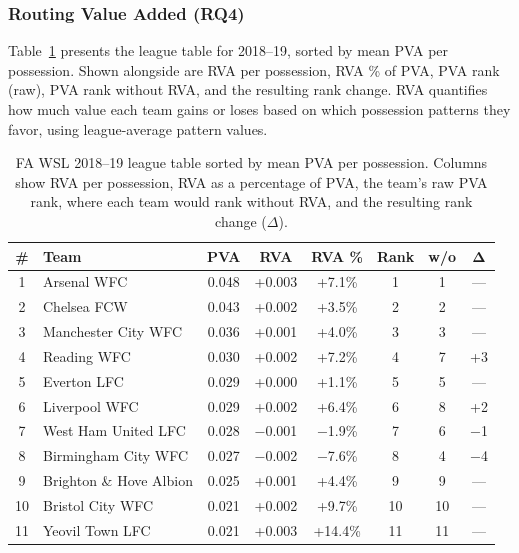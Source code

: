 \documentclass[12pt,a4paper]{article}
\begin{document}
\subsubsection{Routing Value Added (RQ4)}

Table~\ref{tab:rva} presents the league table for 2018--19, sorted by mean PVA per possession. Shown alongside are RVA per possession, RVA \% of PVA, PVA rank (raw), PVA rank without RVA, and the resulting rank change. RVA quantifies how much value each team gains or loses based on which possession patterns they favor, using league-average pattern values.

\begin{table}[H]
\centering
\caption{FA WSL 2018--19 league table sorted by mean PVA per possession. Columns show RVA per possession, RVA as a percentage of PVA, the team's raw PVA rank, where each team would rank without RVA, and the resulting rank change ($\Delta$).}
\label{tab:rva}
\begin{tabular}{clcccccc}
\toprule
\textbf{\#} & \textbf{Team} & \textbf{PVA} & \textbf{RVA} & \textbf{RVA \%} & \textbf{Rank} & \textbf{w/o} & $\boldsymbol{\Delta}$ \\
\midrule
1  & Arsenal WFC         & 0.048 & +0.003 & +7.1\%  & 1  & 1  & --- \\
2  & Chelsea FCW          & 0.043 & +0.002 & +3.5\%  & 2  & 2  & --- \\
3  & Manchester City WFC  & 0.036 & +0.001 & +4.0\%  & 3  & 3  & --- \\
4  & Reading WFC          & 0.030 & +0.002 & +7.2\%  & 4  & 7  & +3 \\
5  & Everton LFC          & 0.029 & +0.000 & +1.1\%  & 5  & 5  & --- \\
6  & Liverpool WFC        & 0.029 & +0.002 & +6.4\%  & 6  & 8  & +2 \\
7  & West Ham United LFC  & 0.028 & $-$0.001 & $-$1.9\% & 7  & 6  & $-$1 \\
8  & Birmingham City WFC  & 0.027 & $-$0.002 & $-$7.6\% & 8  & 4  & $-$4 \\
9  & Brighton \& Hove Albion & 0.025 & +0.001 & +4.4\% & 9  & 9  & --- \\
10 & Bristol City WFC     & 0.021 & +0.002 & +9.7\%  & 10 & 10 & --- \\
11 & Yeovil Town LFC      & 0.021 & +0.003 & +14.4\% & 11 & 11 & --- \\
\bottomrule
\end{tabular}
\end{table}
\end{document}

